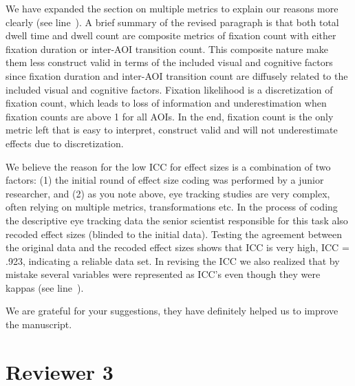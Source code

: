 
We have expanded the section on multiple metrics to explain our reasons more clearly (see line~). A brief summary of the revised paragraph is that both total dwell time and dwell count are composite metrics of fixation count with either fixation duration or inter-AOI transition count. This composite nature make them less construct valid in terms of the included visual and cognitive factors since fixation duration and inter-AOI transition count are diffusely related to the included visual and cognitive factors. Fixation likelihood is a discretization of fixation count, which leads to loss of information and underestimation when fixation counts are above 1 for all AOIs. In the end, fixation count is the only metric left that is easy to interpret, construct valid and will not underestimate effects due to discretization. 



We believe the reason for the low ICC for effect sizes is a combination of two factors: (1) the initial round of effect size coding was performed by a junior researcher, and (2) as you note above, eye tracking studies are very complex, often relying on multiple metrics, transformations etc. In the process of coding the descriptive eye tracking data the senior scientist responsible for this task also recoded effect sizes (blinded to the initial data). Testing the agreement between the original data and the recoded effect sizes shows that ICC is very high, ICC = .923, indicating a reliable data set. In revising the ICC we also realized that by mistake several variables were represented as ICC's even though they were kappas (see line~).



We are grateful for your suggestions, they have definitely helped us to improve the manuscript.




\section{Reviewer 3}
\label{rev:r3}

